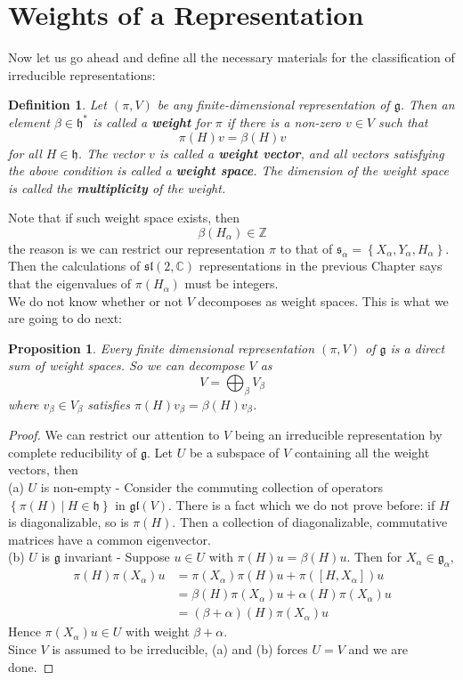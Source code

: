 \documentclass[11pt]{book}
\newtheorem{proposition}[theorem]{Proposition}
\newtheorem{definition}[theorem]{Definition}
\newcommand{\bb}[1]{\mathbb{#1}}
\newcommand{\mf}[1]{\mathfrak{#1}}
\begin{document}
\section{Weights of a Representation}
Now let us go ahead and define all the necessary materials for the classification of irreducible representations:
\begin{definition} \label{defweight}
Let $(\pi,V)$ be any finite-dimensional representation of $\mf{g}$. Then an element $\beta \in \mf{h}^*$ is called a \textbf{weight} for $\pi$ if there is a non-zero $v \in V$ such that
$$\pi(H)v = \beta(H)v$$
for all $H \in \mf{h}$. The vector $v$ is called a \textbf{weight vector}, and all vectors satisfying the above condition is called a \textbf{weight space}. The dimension of the weight space is called the \textbf{multiplicity} of the weight.
\end{definition}
Note that if such weight space exists, then
$$\beta(H_{\alpha}) \in \bb{Z}$$
the reason is we can restrict our representation $\pi$ to that of $\mf{s}_{\alpha} = \left\{X_{\alpha}, Y_{\alpha}, H_{\alpha}\right\}$. Then the calculations of $\mf{sl}(2,\bb{C})$ representations in the previous Chapter says that the eigenvalues of $\pi(H_{\alpha})$ must be integers.\\
We do not know whether or not $V$ decomposes as weight spaces. This is what we are going to do next:
\begin{proposition}
Every finite dimensional representation $(\pi,V)$ of $\mf{g}$ is a direct sum of weight spaces. So we can decompose $V$ as
$$V = \bigoplus_{\beta} V_{\beta}$$
where $v_{\beta} \in V_{\beta}$ satisfies $\pi(H)v_{\beta} = \beta(H)v_{\beta}$.
\end{proposition}
\begin{proof}
We can restrict our attention to $V$ being an irreducible representation by complete reducibility of $\mf{g}$. Let $U$ be a subspace of $V$ containing all the weight vectors, then\\
(a) $U$ is non-empty - Consider the commuting collection of operators $\left\{\pi(H)\ \Big|\ H \in \mf{h}\right\}$ in $\mf{gl}(V)$. There is a fact which we do not prove before: if $H$ is diagonalizable, so is $\pi(H)$. Then a collection of diagonalizable, commutative matrices have a common eigenvector.\\
(b) $U$ is $\mf{g}$ invariant - Suppose $u \in U$ with $\pi(H)u = \beta(H)u$. Then for $X_{\alpha} \in \mf{g}_{\alpha}$,
\begin{align*}
\pi(H)\pi(X_{\alpha})u &= \pi(X_{\alpha})\pi(H)u + \pi([H,X_{\alpha}])u\\
&= \beta(H)\pi(X_{\alpha})u+ \alpha(H)\pi(X_{\alpha})u\\
&= (\beta + \alpha)(H)\pi(X_{\alpha})u
\end{align*}
Hence $\pi(X_{\alpha})u \in U$ with weight $\beta + \alpha$.\\
Since $V$ is assumed to be irreducible, (a) and (b) forces $U = V$ and we are done.
\end{proof}
\end{document}
